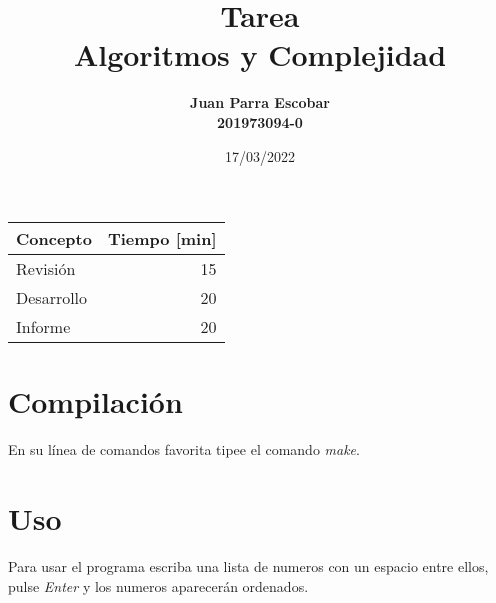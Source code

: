 \documentclass{article}
\title{Tarea \tnum\\
      Algoritmos y Complejidad\\[2ex]
      }
\author{
        \textbf{Juan Parra Escobar}\\
        \textbf{201973094-0}
}
\date{17/03/2022}
\begin{document}
\maketitle
\begin{center}
      \begin{tabular}{|l|r|}
        \hline
        \multicolumn{1}{|c|}{\textbf{Concepto}} &
          \multicolumn{1}{c|}{\textbf{Tiempo [min]}} \\
        \hline
        Revisión & 15\\
        \hline
        Desarrollo    & 20 \\
        \hline
        Informe       & 20 \\
        \hline
      \end{tabular}
    \end{center}
    

    
\section{Compilación}

En su línea de comandos favorita tipee el comando \emph{make}.

\section{Uso}

Para usar el programa escriba una lista de numeros con un espacio entre ellos, pulse \emph{Enter} y los numeros aparecerán ordenados.
\end{document}

